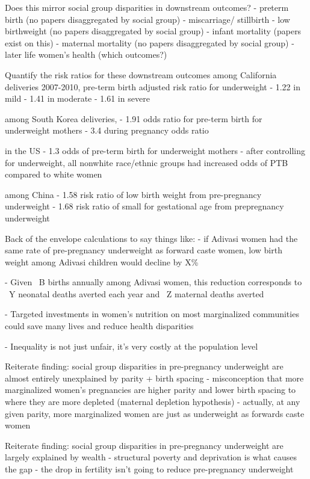 Does this mirror social group disparities in downstream outcomes?
- preterm birth (no papers disaggregated by social group)
- miscarriage/ stillbirth
- low birthweight (no papers disaggregated by social group)
- infant mortality (papers exist on this)
- maternal mortality (no papers disaggregated by social group)
- later life women's health (which outcomes?)


Quantify the risk ratios for these downstream outcomes
\cite{girsen2016women} among California deliveries 2007-2010, pre-term birth adjusted risk ratio for underweight
- 1.22 in mild
- 1.41 in moderate
- 1.61 in severe

\cite{hur2009512} among South Korea deliveries, 
- 1.91 odds ratio for pre-term birth for underweight mothers
- 3.4 during pregnancy odds ratio

\cite{diamond2024impact} in the US
- 1.3 odds of pre-term birth for underweight mothers 
- after controlling for underweight, all nonwhite race/ethnic groups had increased odds of PTB compared to white women

\cite{wenman2004prospective} among China 
- 1.58 risk ratio of low birth weight from pre-pregnancy underweight
- 1.68 risk ratio of small for gestational age from prepregnancy underweight


Back of the envelope calculations to say things like:
- if Adivasi women had the same rate of pre-pregnancy underweight as forward caste women, low birth weight among Adivasi children would decline by X\%


- Given ~B births annually among Adivasi women, this reduction corresponds to ~Y neonatal deaths averted each year and ~Z maternal deaths averted

- Targeted investments in women's nutrition on most marginalized communities could save many lives and reduce health disparities

- Inequality is not just unfair, it's very costly at the population level

Reiterate finding: social group disparities in pre-pregnancy underweight are almost entirely unexplained by parity + birth spacing
- misconception that more marginalized women's pregnancies are higher parity and lower birth spacing to where they are more depleted (maternal depletion hypothesis) 
- actually, at any given parity, more marginalized women are just as underweight as forwards caste women

Reiterate finding: social group disparities in pre-pregnancy underweight are largely explained by wealth
- structural poverty and deprivation is what causes the gap
- the drop in fertility isn't going to reduce pre-pregnancy underweight


